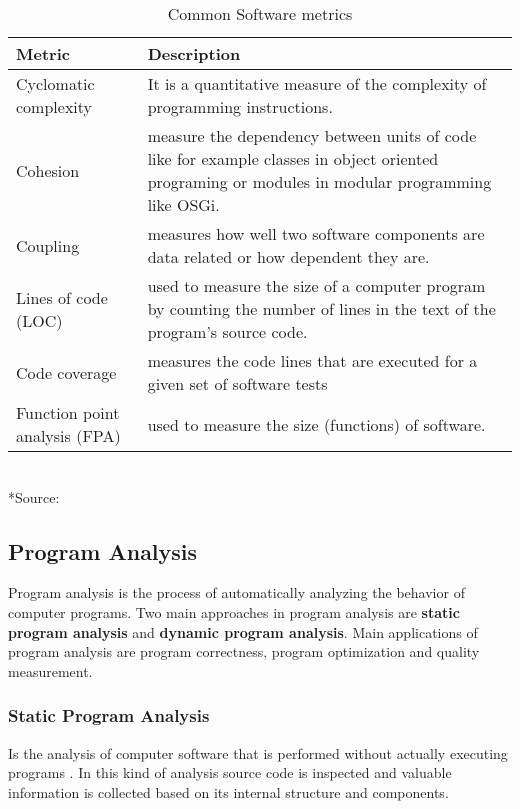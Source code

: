 \begin{table}[h]
\caption{Common Software metrics}
\label{common metrics}
\begin{center}
    \begin{tabular}{  p{3cm} | p{8cm} }
    \hline
    Metric & Description \\  \hline
    Cyclomatic complexity & It is a quantitative measure of the complexity of programming instructions.\\ \hline
    Cohesion & measure the dependency between units of code like for example classes in object oriented programing or modules in modular programming like OSGi. \\ \hline
    Coupling & measures how well two software components are data related or how dependent they are. \\ \hline
    Lines of code (LOC) & used to measure the size of a computer program by counting the number of lines in the text of the program's source code. \\ \hline
    Code coverage & measures the code lines that are executed for a given set of software tests \\ \hline
    Function point analysis (FPA) & used to measure the size (functions) of software. \\
    \hline

    \end{tabular}
    \\*Source: \cite{sqa 2012}
\end{center}
\end{table}

\FloatBarrier


\subsection{Program Analysis}
Program analysis is the process of automatically analyzing the behavior of computer programs. Two main approaches in program analysis are \textbf{static program analysis} and \textbf{dynamic program analysis}. Main applications of program analysis are program correctness, program optimization and quality measurement.

\subsubsection{Static Program Analysis}
 Is the analysis of computer software that is performed without actually executing programs \citep{Wichmann 1995}. In this kind of analysis source code is inspected and valuable information is collected based on its internal structure and components. 

